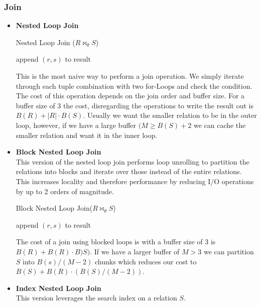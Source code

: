 \subsubsection{Join}
\begin{itemize}
\item \textbf{Nested Loop Join}\\
\begin{algorithm}[h]
\caption{Nested Loop Join ($R \Join_\theta S$)}
\begin{algorithmic}
			\State append $(r, s)$ to result
		\EndIf
	\EndFor
\EndFor
\end{algorithmic}
\end{algorithm}
This is the most naive way to perform a join operation. We simply iterate through each tuple combination with two for-Loops and check the condition. The cost of this operation depends on the join order and buffer size. For a buffer size of 3 the cost, disregarding the operations to write the result out is $B(R) + |R| \cdot B(S)$. Usually we want the smaller relation to be in the outer loop, however, if we have a large buffer $(M \geq B(S) + 2$ we can cache the smaller relation and want it in the inner loop.
\item \textbf{Block Nested Loop Join}\\
This version of the nested loop join performs loop unrolling to partition the relations into blocks and iterate over those instead of the entire relations. This increases locality and therefore performance by reducing I/O operations by up to 2 orders of magnitude.
\begin{algorithm}[h]
\caption{Block Nested Loop Join($R \Join_\theta S$)}
\begin{algorithmic}
					\State append $(r, s)$ to result
				\EndIf
			\EndFor
		\EndFor
	\EndFor
\EndFor
\end{algorithmic}
\end{algorithm}
The cost of a join using blocked loops is with a buffer size of 3 is $B(R) + B(R) \cdot B)S)$. If we have a larger buffer of $M > 3$ we can partition $S$ into $B(s) / (M-2)$ chunks which reduces our cost to $B(S) + B(R)\cdot (B(S) / (M-2))$. 
\item \textbf{Index Nested Loop Join}\\
This version leverages the search index on a relation $S$.

\end{itemize}

